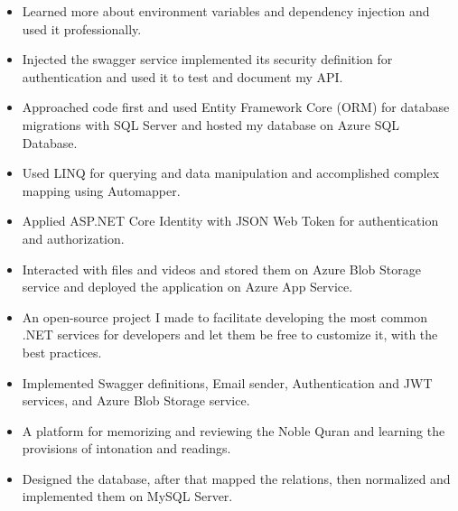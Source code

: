 \documentclass[10pt,a4paper,ragged2e,withhyper]{altacv}
\begin{document}
\begin{paracol}{2}
\divider

\begin{itemize}
    \item Learned more about environment variables and dependency injection and used it professionally.
    \item Injected the swagger service implemented its security definition for authentication and used it to test and document my API.
    \item Approached code first and used Entity Framework Core (ORM) for database migrations with SQL Server and hosted my database on Azure SQL Database.
    \item Used LINQ for querying and data manipulation and accomplished complex mapping using Automapper.
    \item Applied ASP.NET Core Identity with JSON Web Token for authentication and authorization.
    \item Interacted with files and videos and stored them on Azure Blob Storage service and deployed the application on Azure App Service.
\end{itemize}

\divider

\begin{itemize}
    \item An open-source project I made to facilitate developing the most common .NET services for developers and let them be free to customize it, with the best practices.
    \item Implemented Swagger definitions, Email sender, Authentication and JWT services, and Azure Blob Storage service.
\end{itemize}

\divider

\begin{itemize}
    \item A platform for memorizing and reviewing the Noble Quran and learning the provisions of intonation and readings.
    \item Designed the database, after that mapped the relations, then normalized and implemented them on MySQL Server.
\end{itemize}


\end{paracol}
\end{document}
